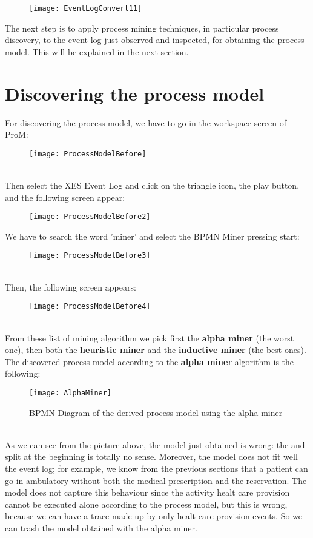 \documentclass[paper=a4, fontsize=11pt]{scrartcl} %
\numberwithin{equation}{section} %
\numberwithin{figure}{section} %
\numberwithin{table}{section} %
\begin{document}
\begin{figure} [htbp]
\centering
\texttt{[image: EventLogConvert11]}
\end{figure}
The next step is to apply process mining techniques, in particular process discovery, to the event log just observed and inspected, for obtaining the process model. This will be explained in the next section.
\newpage
\section{Discovering the process model}
For discovering the process model, we have to go in the workspace screen of ProM:
\begin{figure} [htbp]
\centering
\texttt{[image: ProcessModelBefore]}
\end{figure}\\
Then select the XES Event Log and click on the triangle icon, the play button, and the following screen appear:
\begin{figure} [htbp]
\centering
\texttt{[image: ProcessModelBefore2]}
\end{figure}
\newpage
We have to search the word 'miner' and select the BPMN Miner pressing start:
\begin{figure} [htbp]
\centering
\texttt{[image: ProcessModelBefore3]}
\end{figure}\\
Then, the following screen appears:
\begin{figure} [htbp]
\centering
\texttt{[image: ProcessModelBefore4]}
\end{figure}\\
From these list of mining algorithm we pick first the \textbf{alpha miner} (the worst one), then both the \textbf{heuristic miner} and the \textbf{inductive miner} (the best ones). 
\newpage
The discovered process model according to the \textbf{alpha miner} algorithm is the following:
\begin{figure} [htbp]
\centering
\texttt{[image: AlphaMiner]}
\caption{BPMN Diagram of the derived process model using the alpha miner}
\end{figure}\\
As we can see from the picture above, the model just obtained is wrong: the and split at the beginning is totally no sense. Moreover, the model does not fit well the event log; for example, we know from the previous sections that a patient can go in ambulatory without both the medical prescription and the reservation. The model does not capture this behaviour since the activity healt care provision cannot be executed alone according to the process model, but this is wrong, because we can have a trace made up by only healt care provision events. So we can trash the model obtained with the alpha miner.\\
\end{document}
